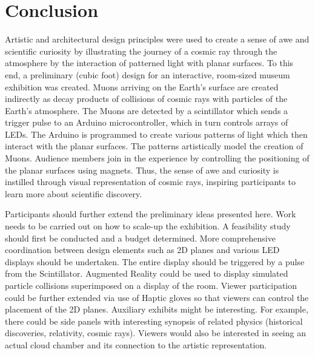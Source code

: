 \documentclass{article}
\begin{document}
\section{Conclusion}
Artistic and architectural design principles were used to create a sense of awe and scientific curiosity by illustrating the journey of a cosmic ray through the atmosphere by the interaction of patterned light with planar surfaces. To this end, a preliminary (cubic foot) design for an interactive, room-sized museum exhibition was created. Muons arriving on the Earth's surface are created indirectly as decay products of collisions of cosmic rays with particles of the Earth's atmosphere. The Muons are detected by a scintillator which sends a trigger pulse to an Arduino microcontroller, which in turn controls arrays of LEDs. The Arduino is programmed to create various patterns of light which then interact with the planar surfaces. The patterns artistically model the creation of Muons. Audience members join in the experience by controlling the positioning of the planar surfaces using magnets. Thus, the sense of awe and curiosity is instilled through visual representation of cosmic rays, inspiring participants to learn more about scientific discovery.

Participants should further extend the preliminary ideas presented here. Work needs to be carried out on how to scale-up the exhibition. A feasibility study should first be conducted and a budget determined. More comprehensive coordination between design elements such as 2D planes and various LED displays should be undertaken. The entire display should be triggered by a pulse from the Scintillator. Augmented Reality could be used to display simulated particle collisions superimposed on a display of the room. Viewer participation could be further extended via use of Haptic gloves so that viewers can control the placement of the 2D planes. Auxiliary exhibits might be interesting. For example, there could be side panels with interesting synopsis of related physics (historical discoveries, relativity, cosmic rays). Viewers would also be interested in seeing an actual cloud chamber and its connection to the artistic representation.
\end{document}
